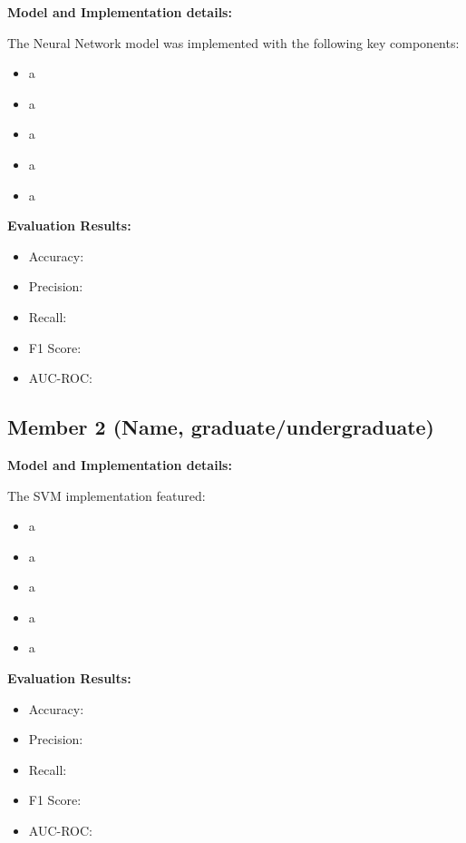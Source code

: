 \documentclass[11pt,a4paper]{article}
\begin{document}
\begin{tcolorbox}[
        title=Neural Network Implementation,
        colback=lightblue!30,
        colframe=darkblue,
        boxrule=0.5pt,
        fonttitle=\bfseries\sffamily\footnotesize,
        fontupper=\footnotesize
    ]
    \textbf{Model and Implementation details:}

    The Neural Network model was implemented with the following key components:
    \begin{itemize}[leftmargin=*, itemsep=2pt, parsep=0pt]
        \item a
        \item a
        \item a
        \item a
        \item a
    \end{itemize}

    \textbf{Evaluation Results:}
    \begin{itemize}[leftmargin=*, itemsep=2pt, parsep=0pt]
        \item Accuracy:
        \item Precision:
        \item Recall:
        \item F1 Score:
        \item AUC-ROC:
    \end{itemize}
\end{tcolorbox}

\subsection{Member 2 (Name, graduate/undergraduate)}

\begin{tcolorbox}[
        title=Support Vector Machine Implementation,
        colback=lightpurple!30,
        colframe=mediumpurple,
        boxrule=0.5pt,
        fonttitle=\bfseries\sffamily\footnotesize,
        fontupper=\footnotesize
    ]
    \textbf{Model and Implementation details:}

    The SVM implementation featured:
    \begin{itemize}[leftmargin=*, itemsep=2pt, parsep=0pt]
        \item a
        \item a
        \item a
        \item a
        \item a
    \end{itemize}

    \textbf{Evaluation Results:}
    \begin{itemize}[leftmargin=*, itemsep=2pt, parsep=0pt]
        \item Accuracy:
        \item Precision:
        \item Recall:
        \item F1 Score:
        \item AUC-ROC:
    \end{itemize}
\end{tcolorbox}
\end{document}
